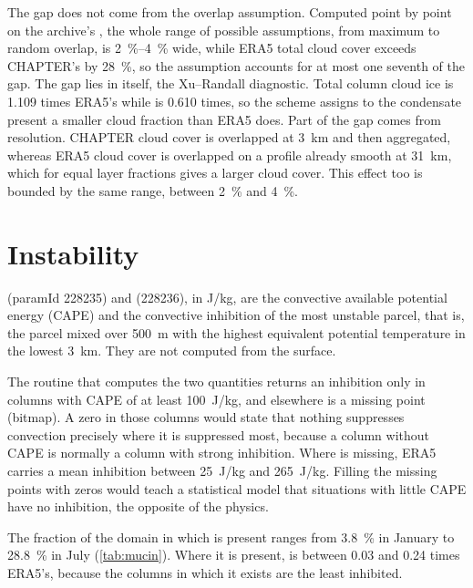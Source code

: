 The gap does not come from the overlap assumption. Computed point by point on the archive's
, the whole range of possible assumptions, from maximum to random overlap, is
\SIrange{2}{4}{\percent} wide, while ERA5 total cloud cover exceeds CHAPTER's by
\SI{28}{\percent}, so the assumption accounts for at most one seventh of the gap. The gap lies in
 itself, the Xu--Randall diagnostic. Total column cloud ice is \num{1.109} times
ERA5's while  is \num{0.610} times, so the scheme assigns to the condensate present a
smaller cloud fraction than ERA5 does. Part of the gap comes from resolution. CHAPTER cloud cover is
overlapped at \SI{3}{km} and then aggregated, whereas ERA5 cloud cover is overlapped on a profile
already smooth at \SI{31}{km}, which for equal layer fractions gives a larger cloud cover. This effect
too is bounded by the same range, between \SI{2}{\percent} and \SI{4}{\percent}.

\section{Instability}
\label{sec:instabilita}

 (paramId 228235) and  (228236), in \si{J/kg}, are the convective
available potential energy (CAPE) and the convective inhibition of the most unstable parcel, that
is, the parcel mixed over \SI{500}{m} with the highest equivalent potential temperature in the
lowest \SI{3}{km}. They are not computed from the surface.

The routine that computes the two quantities returns an inhibition only in columns with CAPE of
at least \SI{100}{J/kg}, and elsewhere  is a missing point (bitmap). A zero in those
columns would state that nothing suppresses convection precisely where it is suppressed most,
because a column without CAPE is normally a column with strong inhibition. Where  is
missing, ERA5 carries a mean inhibition between \SI{25}{J/kg} and \SI{265}{J/kg}. Filling the
missing points with zeros would teach a statistical model that situations with little CAPE have
no inhibition, the opposite of the physics.

The fraction of the domain in which  is present ranges from \SI{3.8}{\percent} in
January to \SI{28.8}{\percent} in July (\cref{tab:mucin}). Where it is present,  is
between \num{0.03} and \num{0.24} times ERA5's, because the columns in which it exists are the
least inhibited.

